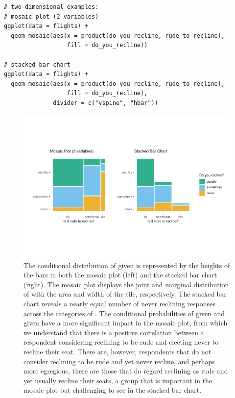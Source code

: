 \begin{verbatim}
# two-dimensional examples:
# mosaic plot (2 variables)
ggplot(data = flights) +
  geom_mosaic(aes(x = product(do_you_recline, rude_to_recline), 
                  fill = do_you_recline))

# stacked bar chart
ggplot(data = flights) + 
  geom_mosaic(aes(x = product(do_you_recline, rude_to_recline), 
                  fill = do_you_recline),
              divider = c("vspine", "hbar"))
\end{verbatim}

\begin{figure}[!h]

{\centering \includegraphics[width=1\linewidth]{jeppson-hofmann_files/figure-latex/variety2-1} 

}

\caption{The conditional distribution of  given  is represented by the heights of the bars in both the mosaic plot (left) and the stacked bar chart (right). The mosaic plot displays the joint and marginal distribution of  with the area and width of the tile, respectively. The stacked bar chart reveals a nearly equal number of never reclining responses across the categories of . The conditional probabilities of  given  and  given  have a more significant impact in the mosaic plot, from which we understand that there is a positive correlation between a respondent considering reclining to be rude and electing never to recline their seat. There are, however, respondents that do not consider reclining to be rude and yet never recline, and perhaps more egregious, there are those that do regard reclining as rude and yet usually recline their seats, a group that is important in the mosaic plot but challenging to see in the stacked bar chart.}\label{fig:variety2}
\end{figure}

